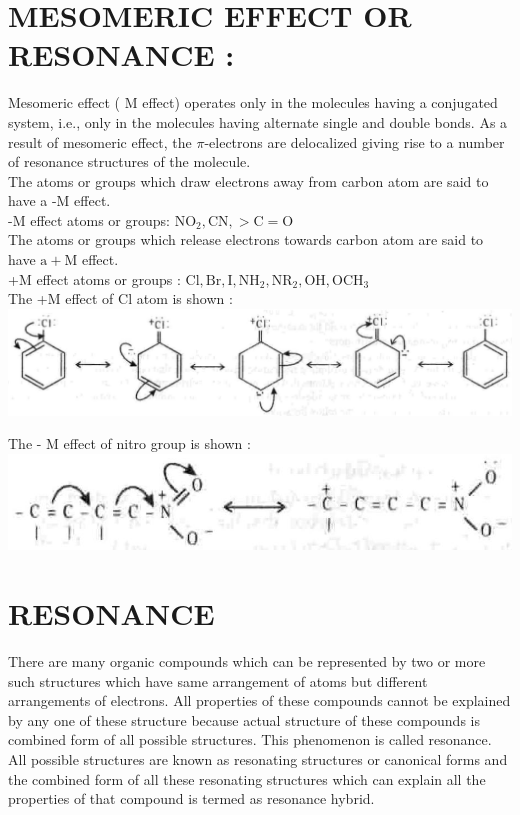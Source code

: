 \documentclass[10pt]{article}
\begin{document}
\section*{MESOMERIC EFFECT OR RESONANCE :}
Mesomeric effect ( M effect) operates only in the molecules having a conjugated system, i.e., only in the molecules having alternate single and double bonds. As a result of mesomeric effect, the $\pi$-electrons are delocalized giving rise to a number of resonance structures of the molecule.\\
The atoms or groups which draw electrons away from carbon atom are said to have a -M effect.\\
-M effect atoms or groups: $\mathrm{NO}_{2}, \mathrm{CN},>\mathrm{C}=\mathrm{O}$\\
The atoms or groups which release electrons towards carbon atom are said to have $\mathrm{a}+\mathrm{M}$ effect.\\
+M effect atoms or groups : $\mathrm{Cl}, \mathrm{Br}, \mathrm{I}, \mathrm{NH}_{2}, \mathrm{NR}_{2}, \mathrm{OH}, \mathrm{OCH}_{3}$\\
The +M effect of Cl atom is shown :\\
\includegraphics[max width=\textwidth, center]{2025_01_28_8470952b98110cec3aabg-069(3)}

The - M effect of nitro group is shown :\\
\includegraphics[max width=\textwidth, center]{2025_01_28_8470952b98110cec3aabg-069}

\section*{RESONANCE}
There are many organic compounds which can be represented by two or more such structures which have same arrangement of atoms but different arrangements of electrons. All properties of these compounds cannot be explained by any one of these structure because actual structure of these compounds is combined form of all possible structures. This phenomenon is called resonance. All possible structures are known as resonating structures or canonical forms and the combined form of all these resonating structures which can explain all the properties of that compound is termed as resonance hybrid.
\end{document}
